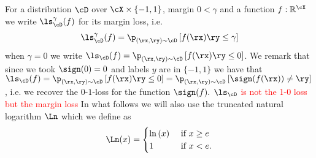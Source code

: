     For a distribution $ \cD $ over $ \cX\times \{  -1,1\}  $, margin $ 0<\gamma $  and a function $ f:\mathbb{R}^{\cX} $ we write $ \ls_{\cD}^{\gamma}(f) $ for its margin loss, i.e.
    \begin{align*}
        \ls_{\cD}^{\gamma}(f) =\p_{(\rx,\ry)\sim\cD}\left[f(\rx)\ry\leq \gamma\right]
    \end{align*}  
    when $ \gamma=0 $ we write  $\ls_{\cD}(f) =\p_{(\rx,\ry)\sim\cD}\left[f(\rx)\ry\leq 0\right]$. We remark that since we took $ \sign(0)=0 $ and labels $ y $ are in $ \{  -1,1\}  $   we have that $ \ls_{\cD}(f)=\p_{(\rx,\ry)\sim\cD}\left[f(\rx)\ry\leq 0\right]=\p_{(\rx,\ry)\sim \cD}\left[\sign(f(\rx))\not=\ry\right] $, i.e. we recover the $ 0 $-$ 1 $-loss for the function $ \sign(f).$     
    \textcolor{red}{$ \ls_{\cD} $ is not the 1-0 loss but the margin loss }
    In what follows we will also use the truncated natural logarithm $ \Ln$ which we define as 
    \begin{align*}
      \Ln(x)=\begin{cases}
        \ln{\left( x\right)} &\text{ if } x\geq e 
        \\
        1                     &\text{ if }   x<e.
      \end{cases}
    \end{align*}